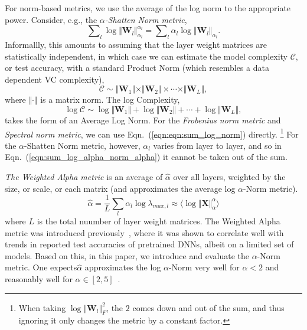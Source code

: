 For norm-based metrics, we use the average of the log norm to the appropriate power.
Consider, e.g., the \emph{$\alpha$-Shatten Norm metric}, 
\begin{equation}
\label{eqn:sum_log_alpha_norm_alpha}
\sum\nolimits_l \log \Vert\mathbf{W}_l\Vert_{\alpha_l}^{\alpha_l} 
=
\sum\nolimits_l \alpha_l \log \Vert\mathbf{W}_l\Vert_{\alpha_l} .
\end{equation}
Informallly, this amounts to assuming that the layer weight matrices are statistically independent, in which case we can estimate the model complexity $\mathcal{C}$, or test accuracy, with a standard Product Norm (which resembles a data dependent VC complexity),
\begin{equation}
\mathcal{C}\sim\Vert\mathbf{W}_{1}\Vert\times\Vert\mathbf{W}_{2}\Vert \times \cdots \times \Vert\mathbf{W}_{L}\Vert ,
\end{equation}
where $\Vert\cdot\Vert$ is a matrix norm.   
The log Complexity,
\begin{equation}
\label{eqn:eqn:sum_log_norm}
\log\mathcal{C} \sim \log\Vert\mathbf{W}_{1}\Vert+\log\Vert\mathbf{W}_{2}\Vert + \cdots + \log\Vert\mathbf{W}_{L}\Vert  ,
\end{equation}
 takes the form of an Average Log Norm.
For the \emph{Frobenius norm metric} and \emph{Spectral norm metric}, we can use Eqn.~(\ref{eqn:eqn:sum_log_norm}) directly. 
\footnote{When taking $\log\Vert\mathbf{W}_{l}\Vert_{F}^{2}$, the $2$ comes down and out of the sum, and thus ignoring it only changes the metric by a constant factor.}
For the $\alpha$-Shatten Norm metric, however, $\alpha_l$ varies from layer to layer, and so in Eqn.~(\ref{eqn:sum_log_alpha_norm_alpha}) it cannot be taken out of the sum.


\emph{The Weighted Alpha metric} is an average of $\hat{\alpha}$ over all layers, weighted by the size, or scale, or each matrix
(and approximates the average log $\alpha$-Norm metric).
\begin{equation}
\hat{\alpha} = \dfrac{1}{L}\sum_l \alpha_l\log\lambda_{max,l}\approx\langle\log\Vert\mathbf{X}\Vert_{\alpha}^{\alpha}\rangle  
\end{equation}
where $L$ is the total nuumber of layer weight matrices.
The Weighted Alpha metric was introduced previously~\cite{MM20_SDM}, where it was shown to correlate well with trends in reported test accuracies of pretrained DNNs, albeit on a limited set of models.
Based on this, in this paper, we introduce and evaluate the $\alpha$-Norm metric.
One expects$\hat{\alpha}$ approximates the log $\alpha$-Norm very well for $\alpha < 2$ and reasonably well for $\alpha\in[2,5]$~\cite{MM20_unpub_work}.  

